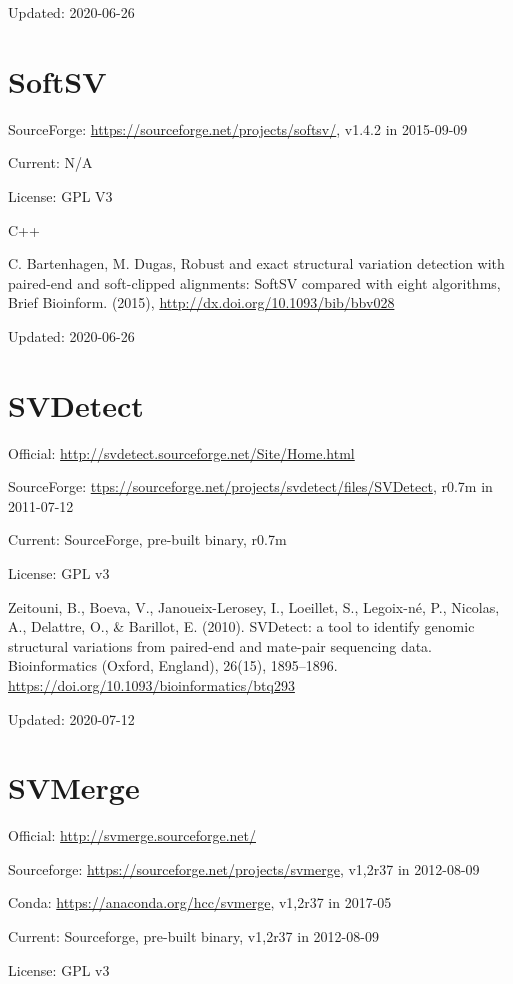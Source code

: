 \documentclass[]{article}
\begin{document}
Updated: 2020-06-26

\section{SoftSV}

SourceForge: \url{https://sourceforge.net/projects/softsv/}, v1.4.2 in 2015-09-09

Current: N/A

License: GPL V3

C++

C. Bartenhagen, M. Dugas, Robust and exact structural variation detection with paired-end and soft-clipped alignments: SoftSV compared with eight algorithms, Brief Bioinform. (2015), \url{http://dx.doi.org/10.1093/bib/bbv028}

Updated: 2020-06-26

\section{SVDetect}

Official: \url{http://svdetect.sourceforge.net/Site/Home.html}

SourceForge: \url{ttps://sourceforge.net/projects/svdetect/files/SVDetect}, r0.7m in 2011-07-12

Current: SourceForge, pre-built binary, r0.7m

License: GPL v3

Zeitouni, B., Boeva, V., Janoueix-Lerosey, I., Loeillet, S., Legoix-né, P., Nicolas, A., Delattre, O., \& Barillot, E. (2010). SVDetect: a tool to identify genomic structural variations from paired-end and mate-pair sequencing data. Bioinformatics (Oxford, England), 26(15), 1895–1896. \url{https://doi.org/10.1093/bioinformatics/btq293}

Updated: 2020-07-12

\section{SVMerge}

Official: \url{http://svmerge.sourceforge.net/}

Sourceforge: \url{https://sourceforge.net/projects/svmerge}, v1,2r37 in 2012-08-09

Conda: \url{https://anaconda.org/hcc/svmerge}, v1,2r37 in 2017-05

Current: Sourceforge, pre-built binary, v1,2r37 in 2012-08-09

License: GPL v3
\end{document}
